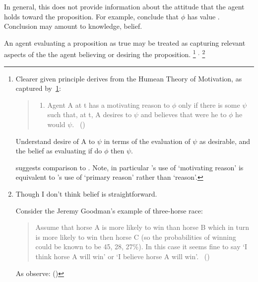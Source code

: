 \begin{note}

  In general, this does not provide information about the attitude that the agent holds toward the proposition.
  For example, conclude that \(\phi\) has value .
  Conclusion may amount to knowledge, belief.
  

  An agent evaluating a proposition as true may be treated as capturing relevant aspects of the the agent believing or desiring the proposition.%
  \footnote{
    \nocite{Hume:2011aa}
    Clearer given principle \citeauthor{Smith:1987vk} derives from the Humean Theory of Motivation, as captured by~\ref{Smithh:HtM:2}:
    \begin{quote}
      \begin{enumerate}[label=\textsc{P1}., ref=(\textsc{P1})]
      \item
        \label{Smithh:HtM:2}
        Agent A at t has a motivating reason to \(\phi\) only if there is some \(\psi\) such that, at t, A desires to \(\psi\) and believes that were he to \(\phi\) he would \(\psi\).%
        \mbox{ }\hfill\mbox{(\citeyear[36]{Smith:1987vk})}
      \end{enumerate}
    \end{quote}

    Understand desire of A to \(\psi\) in terms of the evaluation of \(\psi\) as desirable, and the belief as evaluating if do \(\phi\) then \(\psi\).

    \citeauthor{Smith:1987vk} suggests comparison to \textcite{Davidson:1963aa}.
    Note, in particular \citeauthor{Smith:1987vk}'s use of `motivating reason' is equivalent to \citeauthor{Davidson:1963aa}'s use of `primary reason' rather than `reason'.
  }
  \(^{,}\)%
  \footnote{
    \label{fn:belief-is-difficult}
    Though I don't think belief is straightforward.

    Consider the Jeremy Goodman's example of three-horse race:
    \begin{quote}
      Assume that horse A is more likely to win than horse B which in turn is more likely to win then horse C (so the probabilities of winning could be known to be 45, 28, 27\%).
      In this case it seems fine to say `I think horse A will win' or `I believe horse A will win'.%
      \mbox{ }\hfill\mbox{(\cite[1440]{Hawthorne:2016wv})}
    \end{quote}
    As \citeauthor{Hawthorne:2016wv} observe: 
    (\citeyear[1440, fn.17]{Hawthorne:2016wv})
  }


\end{note}
